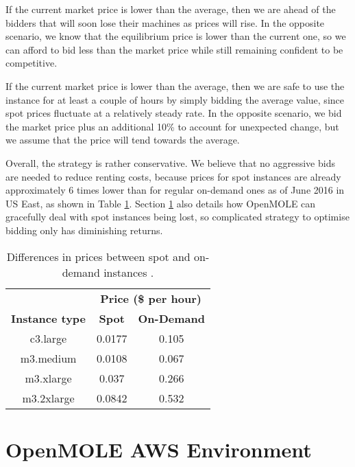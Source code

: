 If the current market price is lower than the average, then we are ahead of the bidders that will soon lose their machines as prices will rise. In the opposite scenario, we know that the equilibrium price is lower than the current one, so we can afford to bid less than the market price while still remaining confident to be competitive.

If the current market price is lower than the average, then we are safe to use the instance for at least a couple of hours by simply bidding the average value, since spot prices fluctuate at a relatively steady rate. In the opposite scenario, we bid the market price plus an additional 10\% to account for unexpected change, but we assume that the price will tend towards the average.

Overall, the strategy is rather conservative. We believe that no aggressive bids are needed to reduce renting costs, because prices for spot instances are already approximately 6 times lower than for regular on-demand ones as of June 2016 in US East, as shown in Table \ref{SpotPricing}. Section \ref{OpenMOLEAWSSection} also details how OpenMOLE can gracefully deal with spot instances being lost, so complicated strategy to optimise bidding only has diminishing returns.

\begin{table}[h]
\centering
\begin{tabular}{ccc}
\multicolumn{1}{l}{} & \multicolumn{2}{c}{\textbf{Price (\$ per hour)}} \\ \cline{2-3} 
\multicolumn{1}{c|}{\textbf{Instance type}} & \multicolumn{1}{c|}{\textbf{Spot}} & \multicolumn{1}{c|}{\textbf{On-Demand}} \\ \hline
\multicolumn{1}{|c|}{c3.large} & \multicolumn{1}{c|}{0.0177} & \multicolumn{1}{c|}{0.105} \\ \hline
\multicolumn{1}{|c|}{m3.medium} & \multicolumn{1}{c|}{0.0108} & \multicolumn{1}{c|}{0.067} \\ \hline
\multicolumn{1}{|c|}{m3.xlarge} & \multicolumn{1}{c|}{0.037} & \multicolumn{1}{c|}{0.266} \\ \hline
\multicolumn{1}{|c|}{m3.2xlarge} & \multicolumn{1}{c|}{0.0842} & \multicolumn{1}{c|}{0.532} \\ \hline
\end{tabular}
\caption{Differences in prices between spot and on-demand instances \cite{AWSPricing}.}
\label{SpotPricing}
\end{table}

\section{OpenMOLE AWS Environment} \label{OpenMOLEAWSSection}

